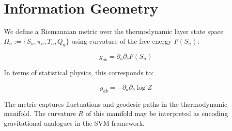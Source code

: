 
\section{Information Geometry}

We define a Riemannian metric over the thermodynamic layer state space $\Omega_n := \{S_n, \pi_n, T_n, Q_n\}$ using curvature of the free energy $F(S_n)$:

\begin{equation*}
g_{ab} = \partial_a \partial_b F(S_n)
\end{equation*}

In terms of statistical physics, this corresponds to:

\begin{equation*}
g_{ab} = -\partial_a \partial_b \log Z
\end{equation*}

The metric captures fluctuations and geodesic paths in the thermodynamic manifold. The curvature $R$ of this manifold may be interpreted as encoding gravitational analogues in the SVM framework.

